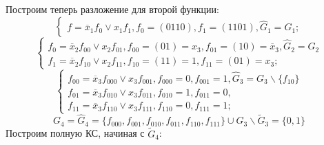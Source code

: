 \documentclass[11pt]{article}
\begin{document}
Построим теперь разложение для второй функции:
\begin{equation*}
\begin{cases}
f = \overline{x}_1f_0\vee x_1f_1, f_0 = (0110), f_1 = (1101), \widehat{G}_1 = G_1;
\end{cases}
\end{equation*}
\begin{equation*}
\begin{cases}
f_0 = \overline{x}_2f_{00}\vee x_2f_{01}, f_{00} = (01) = x_3, f_{01} = (10) = \overline{x}_3, \widehat{G}_2 = G_2 \\
f_1 = \overline{x}_2f_{10}\vee x_2f_{11}, f_{10} = (11) = 1, f_{11} = (01) = x_3;
\end{cases}
\end{equation*}
\begin{equation*}
\begin{cases}
f_{00} = \overline{x}_3f_{000}\vee x_3f_{001}, f_{000} = 0, f_{001} = 1, \widehat{G}_3 = G_3 \backslash \{f_{10}\} \\
f_{01} = \overline{x}_3f_{010}\vee x_3f_{011}, f_{010} = 1, f_{011} = 0, \\
f_{11} = \overline{x}_3f_{110}\vee x_3f_{111}, f_{110} = 0, f_{111} = 1;
\end{cases}
\end{equation*}
\begin{equation*}
G_4 = \widehat{G}_4 = \{f_{000}, f_{001}, f_{010}, f_{011}, f_{110}, f_{111}\} \cup G_3 \backslash \widetilde{G}_3 = \{0, 1\}
\end{equation*}
Построим полную КС, начиная с $\widetilde{G}_4$:
\end{document}
